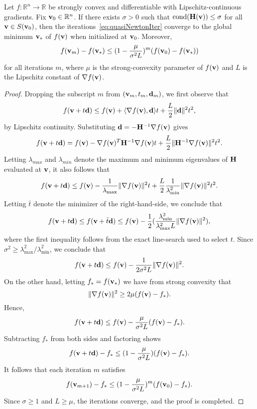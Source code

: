\begin{lemma}\label{lem:GlobalConv}
  Let $f : \mathbb{R}^n \rightarrow \mathbb{R}$ be strongly convex and differentiable
  with Lipschitz-continuous gradients.
  Fix ${\mathbf{v}}_0 \in\mathbb{R}^n$. If there exists $\sigma > 0$
  such that $\text{cond}({\mathbf{H}}({\mathbf{v}})) \le \sigma$ for all  ${\mathbf{v}} \in S({\mathbf{v}}_0)$, then
  the iterations~\eqref{eq:quasiNewtonIter}
  converge to the global minimum ${\mathbf{v}}_*$ of $f({\mathbf{v}})$ when initialized at ${\mathbf{v}}_0$.
  Moreover,
  \[
    f({\mathbf{v}}_m)  - f({\mathbf{v}}_*)  \le (1-\frac{\mu}{\sigma^2 L})^m (f({\mathbf{v}}_0) - f({\mathbf{v}}_*))
  \]
  for all iterations $m$, where $\mu$ is the strong-convexity parameter of $f({\mathbf{v}})$ and $L$ is
  the Lipschitz constant of $\nabla f({\mathbf{v}})$.
  \begin{proof}
    Dropping the subscript $m$ from $({\mathbf{v}}_m, t_m, {\mathbf{d}}_m)$, we first observe that
\[
f({\mathbf{v}}+t{\mathbf{d}}) \le f({\mathbf{v}}) + \langle \nabla f({\mathbf{v}}), {\mathbf{d}} \rangle t + \frac{L}{2}\|{\mathbf{d}}\|^2 t^2,
\]
by Lipschitz continuity.  Substituting ${\mathbf{d}} =- {\mathbf{H}}^{-1}  \nabla  f({\mathbf{v}})$ gives
\[
f({\mathbf{v}}+t{\mathbf{d}}) = f({\mathbf{v}}) - \nabla f({\mathbf{v}})^T  {\mathbf{H}}^{-1}  \nabla  f({\mathbf{v}}) t + \frac{L }{2}\|{\mathbf{H}}^{-1}\nabla f({\mathbf{v}}) \|^2 t^2.
\]
Letting $\lambda_{max}$ and $\lambda_{min}$ denote the
maximum and minimum eigenvalues of ${\mathbf{H}}$ evaluated at ${\mathbf{v}}$, it also follows that
\[
  f({\mathbf{v}}+t{\mathbf{d}}) \le f({\mathbf{v}}) - \frac{1}{\lambda_{\max}} \|\nabla f({\mathbf{v}})\|^2 t  + 
    \frac{L }{2}  \frac{1}{\lambda^{2}_{\min}} \|\nabla f({\mathbf{v}})\|^2 t^2.
\]
Letting $\bar t$ denote the  minimizer of the right-hand-side, we
conclude that
    \[
      f({\mathbf{v}}+t{\mathbf{d}}) \le  f({\mathbf{v}} + \bar t{\mathbf{d}} ) \le f({\mathbf{v}}) - \frac{1}{2}(\frac{\lambda^{2}_{\min}}{\lambda^2_{\max} L} 
      \|\nabla f({\mathbf{v}})\|^2),
    \]
where the first inequality follows from the exact line-search
used to select $t$.
Since  $\sigma^2 \ge \lambda^{2}_{\max}/\lambda^2_{\min}$,
we conclude that
\[
   f({\mathbf{v}} + t {\mathbf{d}}) \le f({\mathbf{v}}) - \frac{1}{2\sigma^2 L}\| \nabla f({\mathbf{v}}) \|^2.
\]
    On the other hand, letting $f_* = f({\mathbf{v}}_*)$ 
    we have from strong convexity that
    \[
  \|\nabla f({\mathbf{v}})\|^2 \ge 2\mu (f({\mathbf{v}})-f_* ).
    \]
Hence,
\[
  f({\mathbf{v}} + t {\mathbf{d}})   \le f({\mathbf{v}}) - \frac{\mu}{\sigma^2 L} (f({\mathbf{v}})-f_* ).
\]
Subtracting $f_*$ from both sides and factoring shows
\[
  f({\mathbf{v}} + t {\mathbf{d}})  - f_* \le  (1-\frac{\mu}{\sigma^2 L})(f({\mathbf{v}}) - f_*).
\]
It follows that each iteration $m$ satisfies
\[
  f({\mathbf{v}}_{m+1}) - f_* \le  (1-\frac{\mu}{\sigma^2 L})^{m}(f({\mathbf{v}}_{0}) - f_*).
\]
Since $\sigma \ge 1$ and $L \ge \mu$, the iterations converge, and the proof is completed.
  \end{proof}
\end{lemma}

